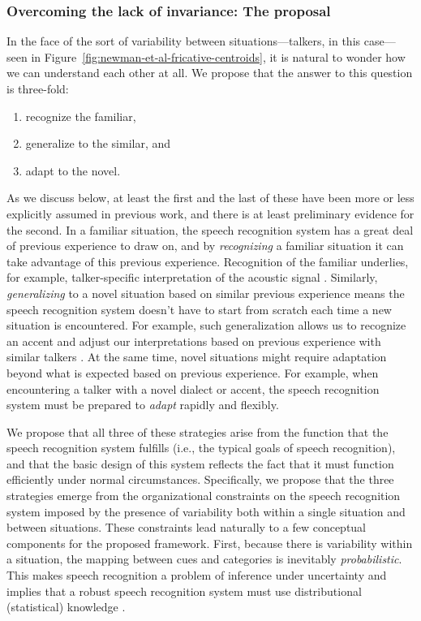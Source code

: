 \subsubsection{Overcoming the lack of invariance: The proposal}
\label{sec:overc-lack-invar}

In the face of the sort of variability between situations---talkers, in this case---seen in Figure~\ref{fig:newman-et-al-fricative-centroids}, it is natural to wonder how we can understand each other at all.  We propose that the answer to this question is three-fold:

\begin{enumerate}
\item recognize the familiar,
\item generalize to the similar, and
\item adapt to the novel.
\end{enumerate}

\label{r1-formalize-prev-work}
As we discuss below, at least the first and the last of these have been more or less explicitly assumed in previous work, and there is at least preliminary evidence for the second.  In a familiar situation, the speech recognition system has a great deal of previous experience to draw on, and by \emph{recognizing} a familiar situation it can take advantage of this previous experience. Recognition of the familiar underlies, for example, talker-specific interpretation of the acoustic signal \autocite{Creel2008,Eisner2005,Goldinger1998,Kraljic2007,Nygaard1998}. Similarly, {\em generalizing} to a novel situation based on similar previous experience means the speech recognition system doesn't have to start from scratch each time a new situation is encountered. For example, such generalization allows us to recognize an accent and adjust our interpretations based on previous experience with similar talkers \autocite{Baese-berk2013,Bradlow2008,Sidaras2009}. At the same time, novel situations might require adaptation beyond what is expected based on previous experience. For example, when encountering a talker with a novel dialect or accent, the speech recognition system must be prepared to \emph{adapt} rapidly and flexibly.

We propose that all three of these strategies arise from the function that the speech recognition system fulfills (i.e., the typical goals of speech recognition), and that the basic design of this system reflects the fact that it must function efficiently under normal
circumstances. Specifically, we propose that the three strategies emerge from the organizational constraints on the speech recognition system imposed by the presence of variability both within a single situation and between situations.  These constraints lead naturally to a few conceptual components for the proposed framework.  First, because there is variability within a situation, the mapping between cues and categories is inevitably \emph{probabilistic}. This makes speech recognition a problem of inference under uncertainty and implies that a robust speech recognition system must use distributional (statistical) knowledge \autocite{Clayards2008,Feldman2009a,Norris2008}.

